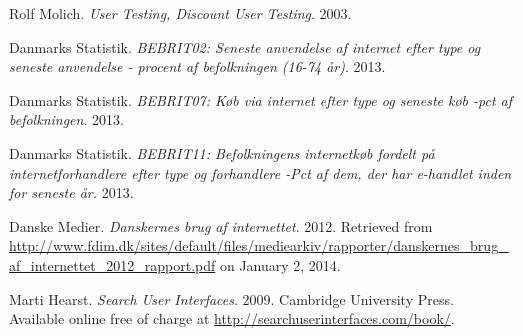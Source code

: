 \begin{thebibliography}{9} %




Rolf Molich. \emph{User Testing, Discount User Testing}. 2003.


Danmarks Statistik. \emph{BEBRIT02: Seneste anvendelse af internet efter type
og seneste anvendelse - procent af befolkningen (16-74 år)}. 2013.


Danmarks Statistik. \emph{BEBRIT07: Køb via internet efter type og seneste køb
-pct af befolkningen}. 2013.


Danmarks Statistik. \emph{BEBRIT11: Befolkningens internetkøb fordelt på
internetforhandlere efter type og forhandlere -Pct af dem, der har e-handlet
inden for seneste år.} 2013.


Danske Medier. \emph{Danskernes brug af internettet}. 2012. Retrieved from
\url{http://www.fdim.dk/sites/default/files/mediearkiv/rapporter/danskernes_brug_af_internettet_2012_rapport.pdf}
on January 2, 2014.


Marti Hearst. \emph{Search User Interfaces}. 2009. Cambridge University Press.
Available online free of charge at \url{http://searchuserinterfaces.com/book/}.

\end{thebibliography}

